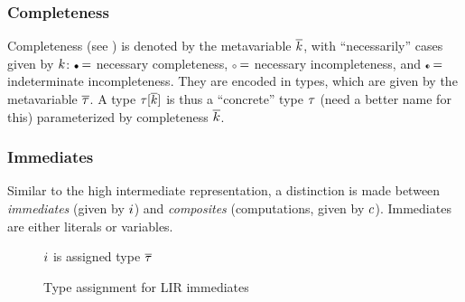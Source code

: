 \documentclass[index.tex]{subfiles}
\begin{document}
\subsubsection{Completeness}
\label{sec:lir-completeness}
Completeness (see ) is denoted by the metavariable $\overline{k}$, with
``necessarily'' cases given by $k$: $\KNC =$ necessary completeness, $\KNI =$
necessary incompleteness, and $\KII =$ indeterminate incompleteness. They are encoded in types,
which are given by the metavariable $\overline{\tau}$. 
%
A type $\tau[\overline{k}]$ is thus a ``concrete'' type $\tau$ (need a
better name for this) parameterized by completeness $\overline{k}$.

\subsubsection{Immediates}
\label{sec:lir-immediates}
Similar to the high intermediate representation, a distinction is made between \emph{immediates}
(given by $i$) and \emph{composites} (computations, given by $c$). Immediates
are either literals or variables.

\begin{figure}[htb!]
  \judgbox{\ctxAssignType{\andCtx{\ctx}{\holeCtx}}{\IMV}{\TMV}}
    $i$ is assigned type $\overline{\tau}$ \\
  
  \caption{Type assignment for LIR immediates}
  \label{fig:lir-ta-imm}
\end{figure}
\end{document}
